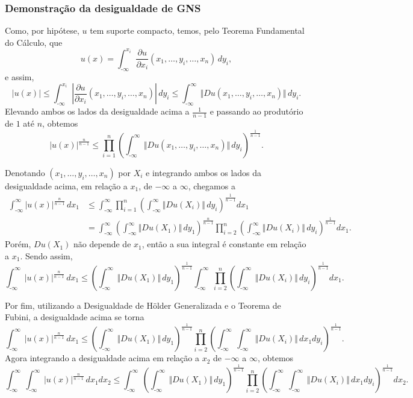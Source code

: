 \documentclass[xcolor=dvipsnames, aspectratio=169, 10pt]{beamer}
\newcommand{\m}{\text{-}}
\begin{document}
\begin{frame}
    \frametitle{Demonstração da desigualdade de GNS}

    \vspace{-5mm}
    \vspace{5mm}

    Como, por hipótese, $u$ tem suporte compacto, temos, pelo Teorema Fundamental do Cálculo, que
    \[
        u(x) = \int_{\m\infty}^{x_i} \dfrac{\partial u}{\partial x_i}(x_1,\dots,y_i,\dots,x_n) \, dy_i,
    \]
    e assim,
    \[
        |u(x)| \leqslant \int_{\m\infty}^{x_i} \left|\dfrac{\partial u}{\partial x_i}(x_1,\dots,y_i,\dots,x_n)\right| \, dy_i  \leqslant \int_{\m\infty}^{\infty} \Vert Du(x_1,\dots,y_i,\dots,x_n) \Vert \,dy_i.
    \]
    Elevando ambos os lados da desigualdade acima a $\frac{1}{n-1}$ e passando ao produtório de $1$ até $n$, obtemos
    \[
        |u(x)|^{\frac{n}{n-1}} \leqslant \prod_{i=1}^n \left( \int_{\m\infty}^{\infty} \Vert Du(x_1,\dots,y_i,\dots,x_n) \Vert \,dy_i \right)^{\frac{1}{n-1}}.
    \]
\end{frame}
\begin{frame}
    Denotando $(x_1,\dots,y_i,\dots,x_n)$ por $X_i$ e integrando ambos os lados da desigualdade acima, em relação a $x_1$, de $-\infty$ a $\infty$, chegamos a
    \[
        \begin{aligned}
            \int_{\m\infty}^{\infty} |u(x)|^{\frac{n}{n-1}} \,dx_1 &\leqslant \int_{\m\infty}^{\infty} \prod_{i=1}^n \left( \int_{\m\infty}^{\infty} \Vert Du(X_i) \Vert \,dy_i \right)^{\frac{1}{n-1}}  dx_1\\ 
            &= \int_{\m\infty}^{\infty} \left( \int_{\m\infty}^{\infty} \Vert Du(X_1    ) \Vert \,dy_1 \right)^{\frac{n}{n-1}}  \prod_{i=2}^n \left(\int_{\m\infty}^{\infty} \Vert Du(X_i) \Vert \, dy_i\right)^{\frac{1}{n-1}} dx_1.
        \end{aligned}
    \]
    Porém, $Du(X_1)$ não depende de $x_1$, então a sua integral é constante em relação a $x_1$. Sendo assim,
    \[
        \int_{\m\infty}^{\infty} |u(x)|^{\frac{n}{n-1}} \,dx_1 \leqslant \left( \int_{\m\infty}^{\infty} \Vert Du(X_1)\Vert \,dy_1 \right)^{\frac{1}{n-1}}\int_{\m\infty}^{\infty}   \prod_{i=2}^n \left(\int_{\m\infty}^{\infty} \Vert Du(X_i) \Vert \, dy_i\right)^{\frac{1}{n-1}} dx_1.
    \]
\end{frame}
\begin{frame}
    Por fim, utilizando a Desigualdade de Hölder Generalizada e o Teorema de Fubini, a desigualdade acima se torna
    \[
        \int_{\m\infty}^{\infty} |u(x)|^{\frac{n}{n-1}} \,dx_1 \leqslant \left( \int_{\m\infty}^{\infty} \Vert Du(X_1)\Vert \,dy_1 \right)^{\frac{1}{n-1}}\prod_{i=2}^n \left(\int_{\m\infty}^{\infty}   \int_{\m\infty}^{\infty} \Vert Du(X_i) \Vert \, dx_1dy_i\right)^{\frac{1}{n-1}}.
    \]
    Agora integrando a desigualdade acima em relação a $x_2$ de $-\infty$ a $\infty$, obtemos
    \[
        \int_{\m\infty}^{\infty}\int_{\m\infty}^{\infty} |u(x)|^{\frac{n}{n-1}} \,dx_1dx_2 \leqslant \int_{\m\infty}^{\infty}\!\!\left( \int_{\m\infty}^{\infty} \Vert Du(X_1)\Vert \,dy_1 \right)^{\frac{1}{n-1}}\prod_{i=2}^n \left(\int_{\m\infty}^{\infty} \!\int_{\m\infty}^{\infty} \Vert Du(X_i) \Vert \, dx_1dy_i\right)^{\frac{1}{n-1}} dx_2.
    \]
\end{frame}
\end{document}
